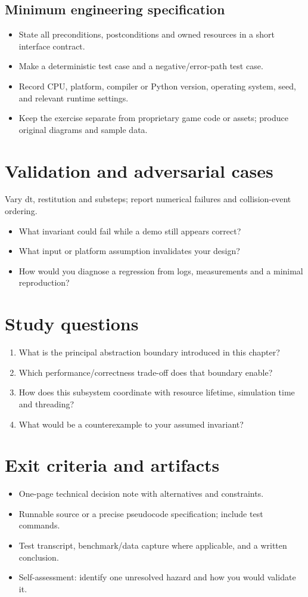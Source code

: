 \documentclass[11pt,letterpaper]{article}
\begin{document}
\subsection{Minimum engineering specification}
\begin{itemize}
\item State all preconditions, postconditions and owned resources in a short interface contract.
\item Make a deterministic test case and a negative/error-path test case.
\item Record CPU, platform, compiler or Python version, operating system, seed, and relevant runtime settings.
\item Keep the exercise separate from proprietary game code or assets; produce original diagrams and sample data.
\end{itemize}
\section{Validation and adversarial cases}
Vary dt, restitution and substeps; report numerical failures and collision-event ordering.

\begin{itemize}
\item What invariant could fail while a demo still appears correct?
\item What input or platform assumption invalidates your design?
\item How would you diagnose a regression from logs, measurements and a minimal reproduction?
\end{itemize}
\section{Study questions}
\begin{enumerate}
\item What is the principal abstraction boundary introduced in this chapter?
\item Which performance/correctness trade-off does that boundary enable?
\item How does this subsystem coordinate with resource lifetime, simulation time and threading?
\item What would be a counterexample to your assumed invariant?
\end{enumerate}
\section{Exit criteria and artifacts}
\begin{itemize}
\item One-page technical decision note with alternatives and constraints.
\item Runnable source or a precise pseudocode specification; include test commands.
\item Test transcript, benchmark/data capture where applicable, and a written conclusion.
\item Self-assessment: identify one unresolved hazard and how you would validate it.
\end{itemize}
\end{document}
